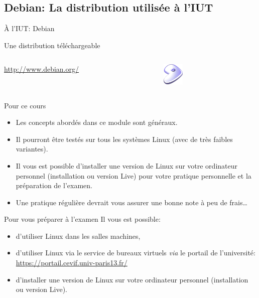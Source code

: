 \subsection{Debian: La distribution utilisée à l'IUT}
\begin{frame}{À l'IUT: Debian}
  \begin{block}{Une distribution téléchargeable}
    \begin{columns}
      \begin{column}{8cm}
        \url{http://www.debian.org/}\\
      \end{column}
      \begin{column}{3cm}
        \includegraphics[width=1cm]{img/s01/gentoo_logo.png}
      \end{column}
    \end{columns}
  \end{block}
  \begin{block}{Pour ce cours}
    \begin{itemize}
    \item Les concepts abordés dans ce module sont généraux.
    \item Il pourront être testés sur tous les systèmes Linux (avec de très faibles variantes).
    \item Il vous est possible d'installer une version de Linux sur votre ordinateur personnel (installation ou version Live) pour votre pratique personnelle et la préparation de l'examen.
    \item Une pratique régulière devrait vous assurer une bonne note à peu de frais\dots
    \end{itemize}
  \end{block}
  \begin{alertblock}{Pour vous préparer à l'examen}
    Il vous est possible:
    \begin{itemize}
    \item d'utiliser Linux dans les salles machines,
    \item d'utiliser Linux via le service de bureaux virtuels \textit{via} le portail de l'université:\\ \url{https://portail.cevif.univ-paris13.fr/}
    \item d'installer une version de Linux sur votre ordinateur personnel (installation ou version Live).
    \end{itemize}
  \end{alertblock}
\end{frame}

